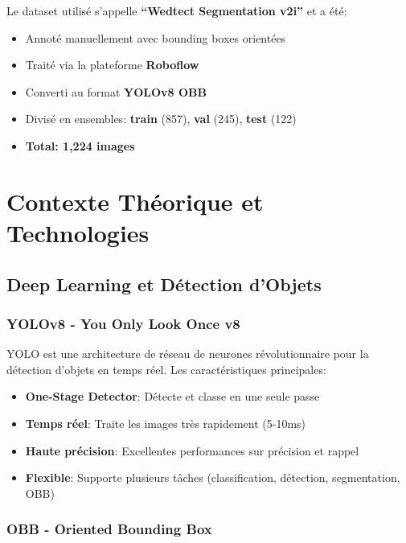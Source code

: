 \documentclass[a4paper,12pt]{report}
\begin{document}
Le dataset utilisé s'appelle \textbf{``Wedtect Segmentation v2i''} et a été:
\begin{itemize}
    \item Annoté manuellement avec bounding boxes orientées
    \item Traité via la plateforme \textbf{Roboflow}
    \item Converti au format \textbf{YOLOv8 OBB}
    \item Divisé en ensembles: \textbf{train} (857), \textbf{val} (245), \textbf{test} (122)
    \item \textbf{Total: 1,224 images}
\end{itemize}

\chapter{Contexte Théorique et Technologies}

\section{Deep Learning et Détection d'Objets}

\subsection{YOLOv8 - You Only Look Once v8}

YOLO est une architecture de réseau de neurones révolutionnaire pour la détection d'objets en temps réel. Les caractéristiques principales:

\begin{itemize}
    \item \textbf{One-Stage Detector}: Détecte et classe en une seule passe
    \item \textbf{Temps réel}: Traite les images très rapidement (5-10ms)
    \item \textbf{Haute précision}: Excellentes performances sur précision et rappel
    \item \textbf{Flexible}: Supporte plusieurs tâches (classification, détection, segmentation, OBB)
\end{itemize}

\subsection{OBB - Oriented Bounding Box}
\end{document}
